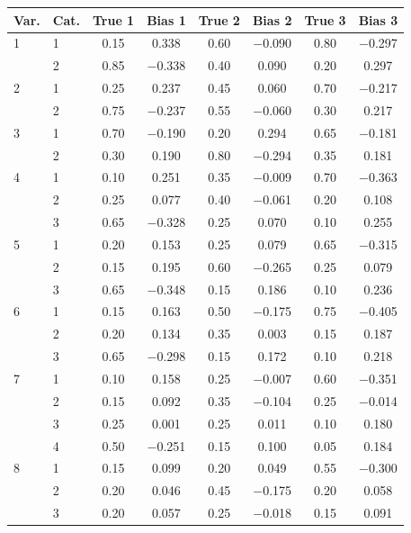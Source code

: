 \begin{table}[H]
\centering
\begin{tabular}{llcccccc}
  \toprule
\textbf{Var.} & \textbf{Cat.} & \textbf{True 1} & \textbf{Bias 1} & \textbf{True 2} & \textbf{Bias 2} & \textbf{True 3} & \textbf{Bias 3} \\ 
  \midrule
1 & 1 & 0.15 & 0.338 & 0.60 & $-$0.090 & 0.80 & $-$0.297 \\ 
   & 2 & 0.85 & $-$0.338 & 0.40 & 0.090 & 0.20 & 0.297 \\ 
  2 & 1 & 0.25 & 0.237 & 0.45 & 0.060 & 0.70 & $-$0.217 \\ 
   & 2 & 0.75 & $-$0.237 & 0.55 & $-$0.060 & 0.30 & 0.217 \\ 
  3 & 1 & 0.70 & $-$0.190 & 0.20 & 0.294 & 0.65 & $-$0.181 \\ 
   & 2 & 0.30 & 0.190 & 0.80 & $-$0.294 & 0.35 & 0.181 \\ 
  4 & 1 & 0.10 & 0.251 & 0.35 & $-$0.009 & 0.70 & $-$0.363 \\ 
   & 2 & 0.25 & 0.077 & 0.40 & $-$0.061 & 0.20 & 0.108 \\ 
   & 3 & 0.65 & $-$0.328 & 0.25 & 0.070 & 0.10 & 0.255 \\ 
  5 & 1 & 0.20 & 0.153 & 0.25 & 0.079 & 0.65 & $-$0.315 \\ 
   & 2 & 0.15 & 0.195 & 0.60 & $-$0.265 & 0.25 & 0.079 \\ 
   & 3 & 0.65 & $-$0.348 & 0.15 & 0.186 & 0.10 & 0.236 \\ 
  6 & 1 & 0.15 & 0.163 & 0.50 & $-$0.175 & 0.75 & $-$0.405 \\ 
   & 2 & 0.20 & 0.134 & 0.35 & 0.003 & 0.15 & 0.187 \\ 
   & 3 & 0.65 & $-$0.298 & 0.15 & 0.172 & 0.10 & 0.218 \\ 
  7 & 1 & 0.10 & 0.158 & 0.25 & $-$0.007 & 0.60 & $-$0.351 \\ 
   & 2 & 0.15 & 0.092 & 0.35 & $-$0.104 & 0.25 & $-$0.014 \\ 
   & 3 & 0.25 & 0.001 & 0.25 & 0.011 & 0.10 & 0.180 \\ 
   & 4 & 0.50 & $-$0.251 & 0.15 & 0.100 & 0.05 & 0.184 \\ 
  8 & 1 & 0.15 & 0.099 & 0.20 & 0.049 & 0.55 & $-$0.300 \\ 
   & 2 & 0.20 & 0.046 & 0.45 & $-$0.175 & 0.20 & 0.058 \\ 
   & 3 & 0.20 & 0.057 & 0.25 & $-$0.018 & 0.15 & 0.091 \\ 

\end{tabular}
\end{table}
